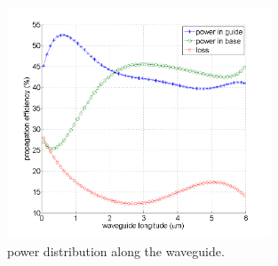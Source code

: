 \begin{figure}[!ht]
\centering
\includegraphics[width=0.7\textwidth]{bilder/power_distribution1}
\caption{power distribution along the waveguide.}
\label{fig:power_distribution}
\end{figure}
